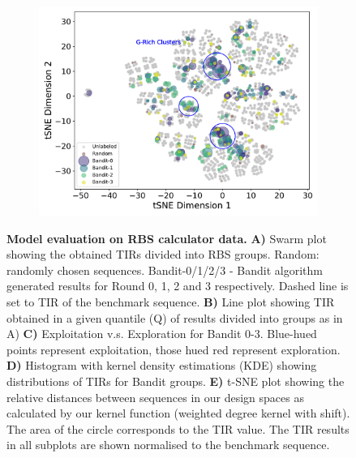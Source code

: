 \begin{figure}[!ht]
\begin{subfigure}[b]{0.48\textwidth}
    \end{subfigure}
    \begin{subfigure}[b]{0.48\textwidth}
        \centering
        \caption{}
        \includegraphics[scale=0.42]{plots/Supplementary/tsneplot_salis.pdf}
    \end{subfigure}
    \caption{
    \textbf{Model evaluation on RBS calculator data.}
    \textbf{A)} Swarm plot showing the obtained TIRs divided into RBS groups.
    Random: randomly chosen sequences.
    Bandit-0/1/2/3 - Bandit algorithm generated results for Round 0, 1, 2 and 3 respectively.
    Dashed line is set to TIR of the benchmark sequence.
    \textbf{B)} Line plot showing TIR obtained in a given quantile (Q) of results divided into groups as in A)
    \textbf{C)} Exploitation v.s. Exploration for Bandit 0-3. Blue-hued points represent exploitation, those hued red represent exploration.
    \textbf{D)} Histogram with kernel density estimations (KDE) showing distributions of TIRs for Bandit groups.
    \textbf{E)} t-SNE plot showing the relative distances between sequences in our design spaces as calculated by our kernel function (weighted degree kernel with shift).
    The area of the circle corresponds to the TIR value.
    The TIR results in all subplots are shown normalised to the  benchmark sequence.}
    \label{fig: Swarmplot and Quantplot Salis}
\end{figure}

